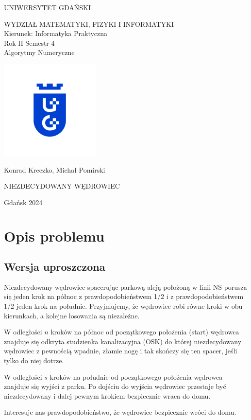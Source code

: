 \documentclass[titlepage]{article}
\begin{document}
\thispagestyle{empty}
\begin{center}
    {\sc \Large UNIWERSYTET GDAŃSKI}
    \par\vspace{1cm}\par
    {\large
    WYDZIAŁ MATEMATYKI, FIZYKI I INFORMATYKI\\
    Kierunek: Informatyka Praktyczna\\
    Rok II Semestr 4\\
    Algorytmy Numeryczne
    }
\end{center}
\begin{center}
    \includegraphics[width=5cm]{ug-logo.png}
\end{center}
\begin{center}
    {\large
    Konrad Kreczko, Michał Pomirski
    }\par\vspace{0.5cm}\par

    {\LARGE
    NIEZDECYDOWANY WĘDROWIEC
    }
\end{center}
\vspace{4cm}
\vfill
\begin{center}
    Gdańsk 2024
\end{center}

\newpage
\tableofcontents
\newpage

\section{Opis problemu}
\subsection{Wersja uproszczona}
Niezdecydowany wędrowiec spacerując parkową aleją położoną w linii NS porusza się jeden krok na północ z prawdopodobieństwem 1/2 i z prawdopodobieństwem 1/2 jeden krok na południe. Przyjmujemy, że wędrowiec robi równe kroki w obu kierunkach, a kolejne losowania są niezależne.
\par W odległości $n$ kroków na północ od początkowego położenia (start) wędrowca znajduje się odkryta studzienka kanalizacyjna (OSK) do której niezdecydowany wędrowiec z pewnością wpadnie, złamie nogę i tak skończy się ten spacer, jeśli tylko do niej dotrze.
\par W odległości $s$ kroków na południe od początkowego położenia wędrowca znajduje się wyjści z parku. Po dojściu do wyjścia wędrowiec przestaje być niezdecydowany i dalej pewnym krokiem bezpiecznie wraca do domu.
\par Interesuje nas prawdopodobieństwo, że wędrowiec bezpiecznie wróci do domu.
\end{document}
